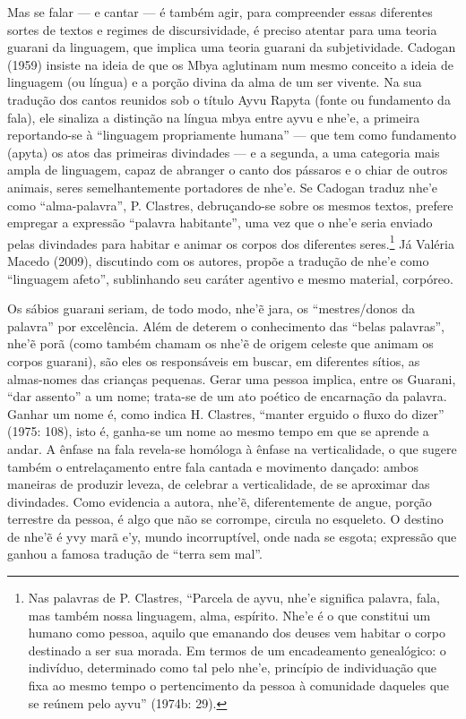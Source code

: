 Mas se falar — e cantar — é também agir, para compreender essas
diferentes sortes de textos e regimes de discursividade, é preciso
atentar para uma teoria guarani da linguagem, que implica uma teoria
guarani da subjetividade. Cadogan (1959) insiste na ideia de que os
Mbya aglutinam num mesmo conceito a ideia de linguagem (ou língua) e a
porção divina da alma de um ser vivente. Na sua tradução dos cantos
reunidos sob o título Ayvu Rapyta (fonte ou fundamento da fala), ele
sinaliza a distinção na língua mbya entre ayvu e nhe’e, a primeira
reportando-se à ``linguagem propriamente humana'' — que tem como
fundamento (apyta) os atos das primeiras divindades — e a segunda, a
uma categoria mais ampla de linguagem, capaz de abranger o canto dos
pássaros e o chiar de outros animais, seres semelhantemente portadores
de nhe’e. Se Cadogan traduz nhe’e como ``alma-palavra'', P. Clastres,
debruçando-se sobre os mesmos textos, prefere empregar a expressão
``palavra habitante'', uma vez que o nhe’e seria enviado pelas divindades
para habitar e animar os corpos dos diferentes seres.\footnote{Nas
palavras de P. Clastres, ``Parcela de ayvu, nhe’e significa palavra,
fala, mas também nossa linguagem, alma, espírito. Nhe’e é o que
constitui um humano como pessoa, aquilo que emanando dos deuses vem
habitar o corpo destinado a ser sua morada. Em termos de um
encadeamento genealógico: o indivíduo, determinado como tal pelo nhe’e,
princípio de individuação que fixa ao mesmo tempo o pertencimento da
pessoa à comunidade daqueles que se reúnem pelo ayvu'' (1974b: 29).} Já
Valéria Macedo (2009), discutindo com os autores, propõe a tradução de
nhe’e como ``linguagem afeto'', sublinhando seu caráter agentivo e mesmo
material, corpóreo. 

Os sábios guarani seriam, de todo modo, nhe’ẽ jara, os
``mestres/donos da palavra'' por excelência. Além de deterem o
conhecimento das ``belas palavras'', nhe’ẽ porã (como também chamam
os nhe’ẽ de origem celeste que animam os corpos guarani), são
eles os responsáveis em buscar, em diferentes sítios, as almas-nomes
das crianças pequenas. Gerar uma pessoa implica, entre os Guarani, ``dar
assento'' a um nome; trata-se de um ato poético de encarnação da
palavra. Ganhar um nome é, como indica H. Clastres, ``manter erguido o
fluxo do dizer'' (1975: 108), isto é, ganha-se um nome ao mesmo tempo em
que se aprende a andar. A ênfase na fala revela-se homóloga à ênfase na
verticalidade, o que sugere também o entrelaçamento entre fala cantada
e movimento dançado: ambos maneiras de produzir leveza, de celebrar a
verticalidade, de se aproximar das divindades. Como evidencia a autora,
nhe’ẽ, diferentemente de angue, porção terrestre da pessoa, é
algo que não se corrompe, circula no esqueleto. O destino de
nhe’ẽ é yvy marã e’y, mundo incorruptível, onde nada se esgota;
expressão que ganhou a famosa tradução de ``terra sem mal''.

